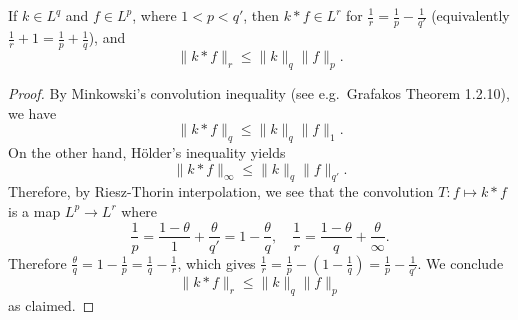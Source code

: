 \begin{theorem}
If $k\in L^q$ and $f\in L^p$, where $1<p<q'$, then $k*f \in L^r$ for $\frac{1}{r}=\frac{1}{p}-\frac{1}{q'}$ (equivalently $\frac{1}{r}+1=\frac{1}{p}+\frac{1}{q}$), and
\begin{equation*}
    \|k*f\|_r \le \|k\|_q \|f\|_p.
\end{equation*}
\end{theorem}

\begin{proof}
By Minkowski's convolution inequality (see e.g.\ Grafakos Theorem 1.2.10), we have
\begin{equation*}
    \|k*f\|_q \le \|k\|_q \|f\|_1.
\end{equation*}
On the other hand, H\"{o}lder's inequality yields
\begin{equation*}
    \|k*f\|_\infty \le \|k\|_q \|f\|_{q'}.
\end{equation*}
Therefore, by Riesz-Thorin interpolation, we see that the convolution $T:f \mapsto k*f$ is a map $L^p\to L^r$ where
\begin{equation*}
    \frac{1}{p}=\frac{1-\theta}{1}+\frac{\theta}{q'}=1-\frac{\theta}{q}, \quad \frac{1}{r}=\frac{1-\theta}{q}+\frac{\theta}{\infty}.
\end{equation*}
Therefore $\frac{\theta}{q}=1-\frac{1}{p}=\frac{1}{q}-\frac{1}{r}$, which gives $\frac{1}{r}=\frac{1}{p}-(1-\frac{1}{q})=\frac{1}{p}-\frac{1}{q'}$. We conclude
\begin{equation*}
    \|k*f\|_r \le \|k\|_q\|f\|_p
\end{equation*}
as claimed.
\end{proof}